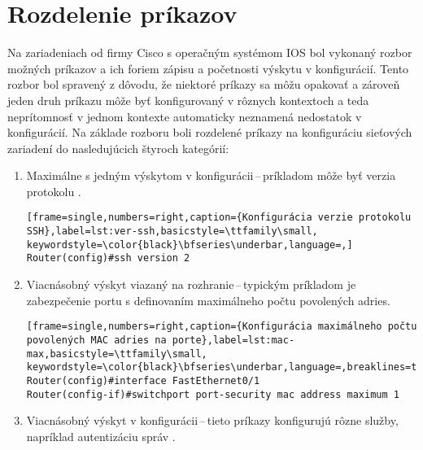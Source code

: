 \section{Rozdelenie príkazov}
Na zariadeniach od firmy Cisco s operačným systémom IOS bol vykonaný rozbor možných príkazov a ich foriem zápisu a početnosti výskytu v konfigurácií. Tento rozbor bol spravený z dôvodu, že niektoré príkazy sa môžu opakovať a zároveň jeden druh príkazu môže byť konfigurovaný v rôznych kontextoch a teda neprítomnosť v jednom kontexte automaticky neznamená nedostatok v konfigurácií. Na základe rozboru boli rozdelené príkazy na konfiguráciu sieťových zariadení do nasledujúcich štyroch kategórií:
\\
\begin{enumerate}
	\item Maximálne s jedným výskytom v konfigurácii\,--\,príkladom môže byť verzia protokolu .
	
\begin{minipage}{\linewidth}		
\begin{lstlisting}[frame=single,numbers=right,caption={Konfigurácia verzie protokolu SSH},label=lst:ver-ssh,basicstyle=\ttfamily\small, keywordstyle=\color{black}\bfseries\underbar,language=,]
Router(config)#ssh version 2
\end{lstlisting}
\end{minipage}
	
	\item \vspace{2em} Viacnásobný výskyt viazaný na rozhranie\,--\,typickým príkladom je zabezpečenie portu s definovaním maximálneho počtu povolených  adries.
	
\begin{minipage}{\linewidth}		
\begin{lstlisting}[frame=single,numbers=right,caption={Konfigurácia maximálneho počtu povolených MAC adries na porte},label=lst:mac-max,basicstyle=\ttfamily\small, keywordstyle=\color{black}\bfseries\underbar,language=,breaklines=true]
Router(config)#interface FastEthernet0/1
Router(config-if)#switchport port-security mac address maximum 1
\end{lstlisting}
\end{minipage}

	\item \vspace{2em} Viacnásobný výskyt v konfigurácii\,--\,tieto príkazy konfigurujú rôzne služby, napríklad autentizáciu správ .


\end{enumerate}
